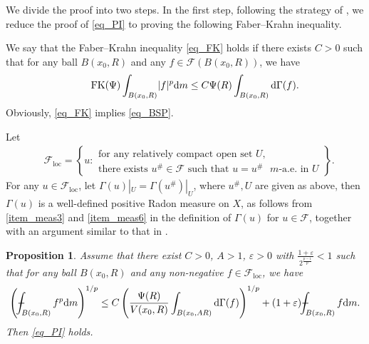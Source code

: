 \documentclass[11pt,a4paper]{article}
\numberwithin{equation}{section}
\def\Xint#1{\mathchoice
{\XXint\displaystyle\textstyle{#1}}%
{\XXint\textstyle\scriptstyle{#1}}%
{\XXint\scriptstyle\scriptscriptstyle{#1}}%
{\XXint\scriptscriptstyle\scriptscriptstyle{#1}}%
\!\int}
\def\XXint#1#2#3{{\setbox0=\hbox{$#1{#2#3}{\int}$ }
\vcenter{\hbox{$#2#3$ }}\kern-.6\wd0}}
\def\dashint{\Xint-}
\theoremstyle{plain}
\newtheorem{proposition}[theorem]{Proposition}
\theoremstyle{definition}
\begin{document}
We divide the proof into two steps. In the first step, following the strategy of \cite{EK26}, we reduce the proof of \ref{eq_PI} to proving the following Faber--Krahn inequality.

We say that the Faber--Krahn inequality \ref{eq_FK} holds if there exists $C>0$ such that for any ball $B(x_0,R)$ and any $f\in \mathcal{F}(B(x_0,R))$, we have
\begin{equation*}\label{eq_FK}\tag*{$\text{FK}(\Psi)$}
\int_{B(x_0,R)}\lvert f\rvert^p \mathrm{d}m\le C\Psi(R)\int_{B(x_0,R)} \mathrm{d}\Gamma(f).
\end{equation*}
Obviously, \ref{eq_FK} implies \ref{eq_BSP}.

Let
\begin{align*}
&\mathcal{F}_{\mathrm{loc}}=\left\{u:
\begin{array}{l}
\text{for any relatively compact open set }U,\\
\text{there exists }u^\#\in \mathcal{F}\text{ such that }u=u^\#\text{ }m\text{-a.e. in }U
\end{array}
\right\}.
\end{align*}
For any $u\in \mathcal{F}_{\mathrm{loc}}$, let $\Gamma(u)|_U=\Gamma(u^\#)|_U$, where $u^\#, U$ are given as above, then $\Gamma(u)$ is a well-defined positive Radon measure on $X$, as follows from \ref{item_meas3} and \ref{item_meas6} in the definition of $\Gamma(u)$ for $u\in \mathcal{F}$, together with an argument similar to that in \cite[Corollary 3.2.1]{FOT11}.

\begin{proposition}\label{prop_PI}
Assume that there exist $C>0$, $A>1$, $\varepsilon>0$ with $\frac{1+\varepsilon}{2^{\frac{p-1}{p}}}<1$ such that for any ball $B(x_0,R)$ and any non-negative $f\in \mathcal{F}_{\mathrm{loc}}$, we have
\begin{equation}\label{eq_weakPI}
\left(\dashint_{B(x_0,R)}f^p \mathrm{d}m\right)^{1/p}\le C\left(\frac{\Psi(R)}{V(x_0,R)}\int_{B(x_0,AR)} \mathrm{d}\Gamma(f)\right)^{1/p}+(1+\varepsilon) \dashint_{B(x_0,R)}f \mathrm{d}m.
\end{equation}
Then \ref{eq_PI} holds.
\end{proposition}
\end{document}

